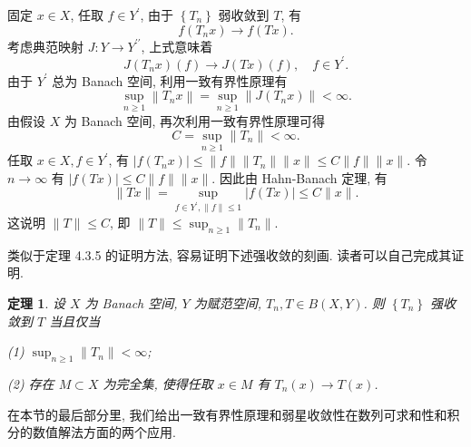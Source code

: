 \documentclass[openany]{ctexbook}
\makeatletter
\theoremstyle{kaiti}
\newtheorem{theorem}{定理}[section]
\theoremstyle{normal}
\renewenvironment{proof}[1][\proofname]{\par
    \pushQED{\qed}%
    \normalfont \topsep6\p@\@plus6\p@\relax
    \trivlist
    \item\relax
    {\heiti #1}\hspace{2\labelsep}\ignorespaces
  }{%
    \popQED\endtrivlist\@endpefalse
  }
\makeatother
\begin{document}
\begin{proof}
固定 $x \in X$, 任取 $f \in Y^{\prime}$, 由于 $\left\{T_n\right\}$ 弱收敛到 $T$, 有
$$
f\left(T_n x\right) \rightarrow f(T x).
$$
考虑典范映射 $J: Y \rightarrow Y^{\prime \prime}$, 上式意味着
$$
J\left(T_n x\right)(f) \rightarrow J(T x)(f), \quad f \in Y^{\prime}.
$$
由于 $Y^{\prime}$ 总为 Banach 空间, 利用一致有界性原理有
$$
\sup_{n \geqslant 1}\left\|T_n x\right\|=\sup_{n \geqslant 1}\left\|J\left(T_n x\right)\right\|<\infty.
$$
由假设 $X$ 为 Banach 空间, 再次利用一致有界性原理可得
$$
C=\sup_{n \geqslant 1}\left\|T_n\right\|<\infty.
$$
任取 $x \in X, f \in Y^{\prime}$, 有
$\left|f\left(T_n x\right)\right| \leqslant\|f\|\left\|T_n\right\|\|x\| \leqslant C\|f\|\|x\|$.
令 $n \rightarrow \infty$ 有 $|f(T x)| \leqslant C\|f\|\|x\|$. 因此由 Hahn-Banach 定理, 有
$$
\|T x\|=\sup_{f \in Y^{\prime},\|f\| \leqslant 1}|f(T x)| \leqslant C\|x\|.
$$
这说明 $\|T\| \leqslant C$, 即 $\|T\| \leqslant \sup_{n \geqslant 1}\left\|T_n\right\|$.
\end{proof}

类似于定理 4.3.5 的证明方法, 容易证明下述强收敛的刻画. 读者可以自己完成其证明.

\begin{theorem}
设 $X$ 为 Banach 空间, $Y$ 为赋范空间, $T_n, T \in B(X, Y)$. 则 $\left\{T_n\right\}$ 强收敛到 $T$ 当且仅当

(1) $\sup_{n \geqslant 1}\left\|T_n\right\|<\infty$;

(2) 存在 $M \subset X$ 为完全集, 使得任取 $x \in M$ 有 $T_n(x) \rightarrow T(x)$.
\end{theorem}

在本节的最后部分里, 我们给出一致有界性原理和弱星收敛性在数列可求和性和积分的数值解法方面的两个应用.
\end{document}
